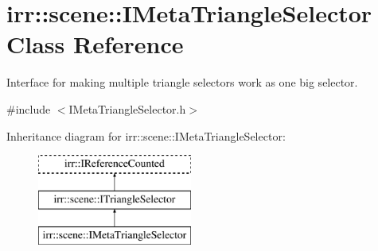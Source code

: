 \hypertarget{classirr_1_1scene_1_1IMetaTriangleSelector}{}\section{irr\+:\+:scene\+:\+:I\+Meta\+Triangle\+Selector Class Reference}
\label{classirr_1_1scene_1_1IMetaTriangleSelector}


Interface for making multiple triangle selectors work as one big selector.  




{\ttfamily \#include $<$I\+Meta\+Triangle\+Selector.\+h$>$}

Inheritance diagram for irr\+:\+:scene\+:\+:I\+Meta\+Triangle\+Selector\+:\begin{figure}[H]
\begin{center}
\leavevmode
\includegraphics[height=3.000000cm]{classirr_1_1scene_1_1IMetaTriangleSelector}
\end{center}
\end{figure}
